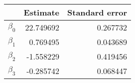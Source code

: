 \begin{tabular}{lrr}
\toprule
{} &   Estimate &  Standard error \\
\midrule
$\beta_0$ &  22.749692 &        0.267732 \\
$\beta_1$ &   0.769495 &        0.043689 \\
$\beta_2$ &  -1.558229 &        0.419456 \\
$\beta_3$ &  -0.285742 &        0.068447 \\
\bottomrule
\end{tabular}
